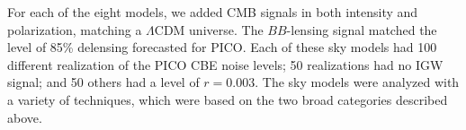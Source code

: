 \documentclass[PICOReport.tex]{subfiles}
\begin{document}
For each of the eight models, we added CMB signals in both intensity and polarization, matching a $\Lambda$CDM universe. The $BB$-lensing signal matched the level of 85\% delensing forecasted for PICO. Each of these sky models had 100 different realization of the PICO CBE noise levels; 50 realizations had no \ac{IGW} signal; and 50 others had a level of $r=0.003$. 
The sky models were analyzed with a variety of techniques, which were based on the two broad categories described above. 





\end{document}
